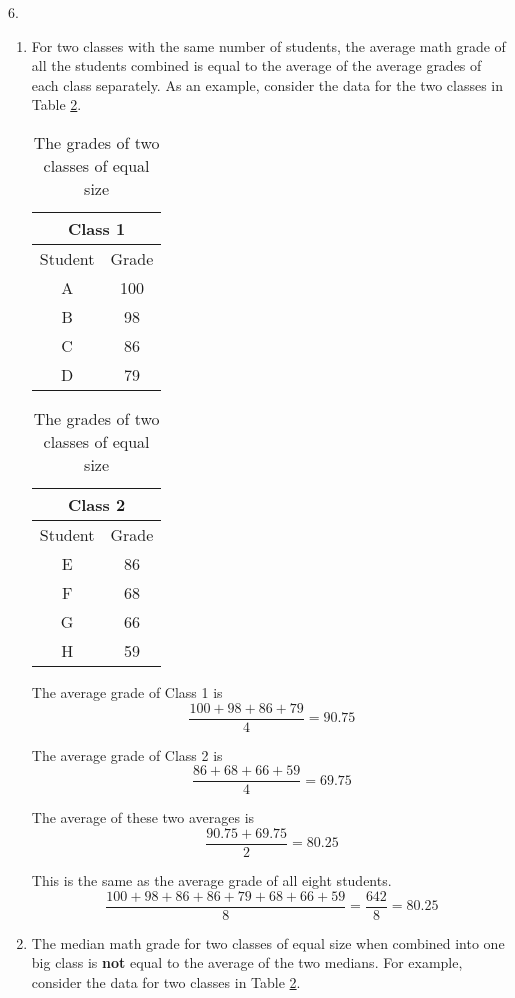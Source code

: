 \documentclass[fleqn]{article}
\begin{document}
\begin{answers}
	\item[6.]
	\begin{enumerate}
		\item %
		For two classes with the same number of students, the average math grade of all the students combined is equal to the average of the average grades of each class separately. As an example, consider the data for the two classes in Table \ref{q6a-class-grades}.
		\begin{table}[htb]
			\centering
			\begin{tabular}{||c|c||}
				\multicolumn{2}{c}{Class 1} \\
				\hline
				Student & Grade \\
				\hline
				A & 100 \\
				B & 98 \\
				C & 86 \\
				D & 79 \\
				\hline
			\end{tabular}
			\hspace{10pt}
			\begin{tabular}{||c|c||}
				\multicolumn{2}{c}{Class 2} \\
				\hline
				Student & Grade \\
				\hline
				E & 86 \\
				F & 68 \\
				G & 66 \\
				H & 59 \\
				\hline
			\end{tabular}
			\caption{The grades of two classes of equal size}
			\label{q6a-class-grades}
		\end{table}

		The average grade of Class 1 is
		\[\frac{100 + 98 + 86 + 79}{4} = 90.75\]

		The average grade of Class 2 is
		\[\frac{86 + 68 + 66 + 59}{4} = 69.75\]

		The average of these two averages is
		\[\frac{90.75 + 69.75}{2} = 80.25\]

		This is the same as the average grade of all eight students.
		\[\frac{100 + 98 + 86 + 86 + 79 + 68 + 66 + 59}{8} = \frac{642}{8} = 80.25\]

		\item %
		The median math grade for two classes of equal size when combined into one big class is \textbf{not} equal to the average of the two medians. For example, consider the data for two classes in Table \ref{q6a-class-grades}.


\end{enumerate}
\end{answers}
\end{document}
